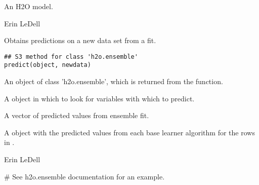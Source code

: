 \documentclass[a4paper]{book}
\begin{document}
%
\begin{Value}
An H2O model.
\end{Value}
%
\begin{Author}\relax
Erin LeDell 
\end{Author}
%
\begin{SeeAlso}\relax
{}
\end{SeeAlso}
%
\begin{Description}\relax
Obtains predictions on a new data set from a  fit.  
\end{Description}
%
\begin{Usage}
\begin{verbatim}
## S3 method for class 'h2o.ensemble'
predict(object, newdata)
\end{verbatim}
\end{Usage}
%
\begin{Arguments}
\begin{ldescription}
\item[\code{object}] 
An object of class 'h2o.ensemble', which is returned from the  function.

\item[\code{newdata}] 
A  object in which to look for variables with which to predict. 


\end{ldescription}
\end{Arguments}
%
\begin{Value}
\begin{ldescription}
\item[\code{pred}] 
A vector of predicted values from ensemble fit.

\item[\code{basepred}] 
A  object with the predicted values from each base learner algorithm for the rows in .  

\end{ldescription}
\end{Value}
%
\begin{Author}\relax
Erin LeDell 
\end{Author}
%
\begin{SeeAlso}\relax
{}
\end{SeeAlso}
%
\begin{Examples}
\begin{ExampleCode}
# See h2o.ensemble documentation for an example.

\end{ExampleCode}
\end{Examples}
\printindex{}
\end{document}
